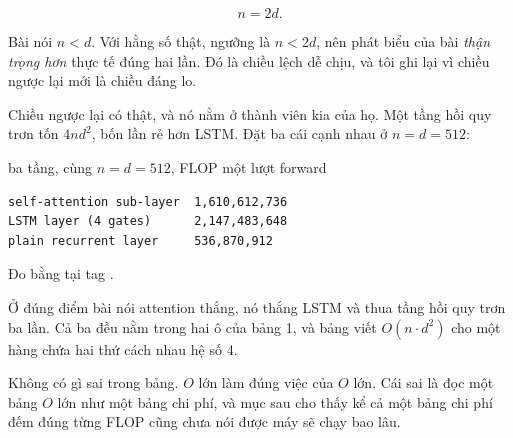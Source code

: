 \begin{equation}
  n = 2d .
  \label{eq:ch08-attention-vs-lstm}
\end{equation}

Bài nói \(n < d\). Với hằng số thật, ngưỡng là \(n < 2d\), nên phát biểu của bài
\emph{thận trọng hơn} thực tế đúng hai lần. Đó là chiều lệch dễ chịu, và tôi ghi
lại vì chiều ngược lại mới là chiều đáng lo.

Chiều ngược lại có thật, và nó nằm ở thành viên kia của họ. Một tầng hồi quy
trơn tốn \(4nd^2\), bốn lần rẻ hơn LSTM. Đặt ba cái cạnh nhau ở \(n = d = 512\):

\begin{measured}{ba tầng, cùng \(n = d = 512\), FLOP một lượt forward}
\begin{verbatim}
self-attention sub-layer  1,610,612,736
LSTM layer (4 gates)      2,147,483,648
plain recurrent layer     536,870,912
\end{verbatim}

Đo bằng  tại tag .
\end{measured}

Ở đúng điểm bài nói attention thắng, nó thắng LSTM và thua tầng hồi quy trơn ba
lần. Cả ba đều nằm trong hai ô của bảng 1, và bảng viết \(O(n \cdot d^2)\) cho
một hàng chứa hai thứ cách nhau hệ số 4.

Không có gì sai trong bảng. \(O\) lớn làm đúng việc của \(O\) lớn. Cái sai là
đọc một bảng \(O\) lớn như một bảng chi phí, và mục sau cho thấy kể cả một bảng
chi phí đếm đúng từng FLOP cũng chưa nói được máy sẽ chạy bao lâu.
